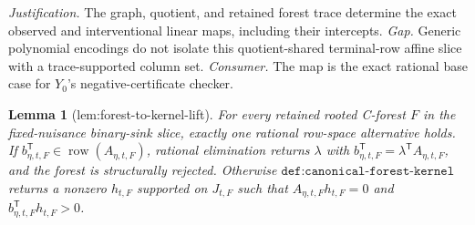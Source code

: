 \documentclass{article}
\newtheorem{lemma}{Lemma}
\begin{document}
\par\smallskip\noindent \textit{Justification.} The graph, quotient, and retained forest trace determine the exact observed and interventional linear maps, including their intercepts. \textit{Gap.} Generic polynomial encodings do not isolate this quotient-shared terminal-row affine slice with a trace-supported column set. \textit{Consumer.} The map is the exact rational base case for \(Y_0\)'s negative-certificate checker.

\begin{lemma}[lem:forest-to-kernel-lift]\label{lem:forest-to-kernel-lift}
For every retained rooted C-forest \(F\) in the fixed-nuisance binary-sink slice, exactly one rational row-space alternative holds. If \(b_{\eta,t,F}^{\mathsf T}\in\operatorname{row}(A_{\eta,t,F})\), rational elimination returns \(\lambda\) with \(b_{\eta,t,F}^{\mathsf T}=\lambda^{\mathsf T}A_{\eta,t,F}\), and the forest is structurally rejected. Otherwise \(\texttt{def:canonical-forest-kernel}\) returns a nonzero \(h_{t,F}\) supported on \(J_{t,F}\) such that \(A_{\eta,t,F}h_{t,F}=0\) and \(b_{\eta,t,F}^{\mathsf T}h_{t,F}>0\).
\end{lemma}
\end{document}
